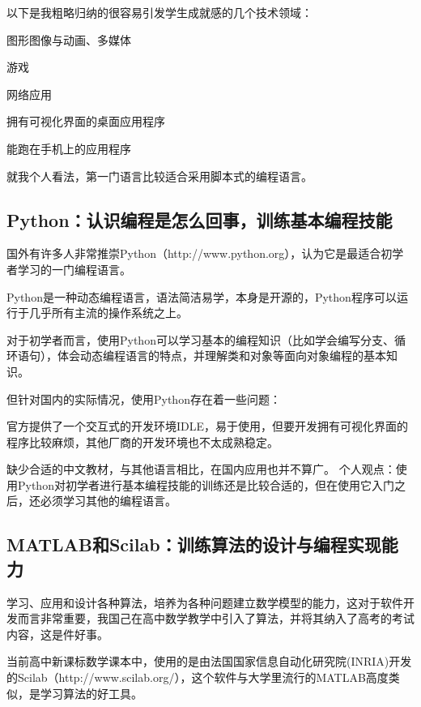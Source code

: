 以下是我粗略归纳的很容易引发学生成就感的几个技术领域：

\begin{compactenum}
\item 图形图像与动画、多媒体
\item 游戏
\item 网络应用
\item 拥有可视化界面的桌面应用程序
\item 能跑在手机上的应用程序
\end{compactenum}


就我个人看法，第一门语言比较适合采用脚本式的编程语言。


\subsection{Python：认识编程是怎么回事，训练基本编程技能}

国外有许多人非常推崇Python（http://www.python.org），认为它是最适合初学者学习的一门编程语言。

Python是一种动态编程语言，语法简洁易学，本身是开源的，Python程序可以运行于几乎所有主流的操作系统之上。

对于初学者而言，使用Python可以学习基本的编程知识（比如学会编写分支、循环语句），体会动态编程语言的特点，并理解类和对象等面向对象编程的基本知识。

但针对国内的实际情况，使用Python存在着一些问题：

\begin{compactenum}
\item 官方提供了一个交互式的开发环境IDLE，易于使用，但要开发拥有可视化界面的程序比较麻烦，其他厂商的开发环境也不太成熟稳定。

\item 缺少合适的中文教材，与其他语言相比，在国内应用也并不算广。  个人观点：使用Python对初学者进行基本编程技能的训练还是比较合适的，但在使用它入门之后，还必须学习其他的编程语言。
\end{compactenum}


\subsection{MATLAB和Scilab：训练算法的设计与编程实现能力}


学习、应用和设计各种算法，培养为各种问题建立数学模型的能力，这对于软件开发而言非常重要，我国己在高中数学教学中引入了算法，并将其纳入了高考的考试内容，这是件好事。

当前高中新课标数学课本中，使用的是由法国国家信息自动化研究院(INRIA)开发的Scilab（http://www.scilab.org/），这个软件与大学里流行的MATLAB高度类似，是学习算法的好工具。

